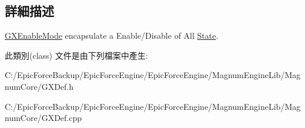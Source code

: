\subsection{詳細描述}
\hyperlink{class_magnum_1_1_g_x_enable_mode}{G\+X\+Enable\+Mode} encapsulate a Enable/\+Disable of All \hyperlink{class_magnum_1_1_state}{State}. 

此類別(class) 文件是由下列檔案中產生\+:\begin{DoxyCompactItemize}
\item 
C\+:/\+Epic\+Force\+Backup/\+Epic\+Force\+Engine/\+Epic\+Force\+Engine/\+Magnum\+Engine\+Lib/\+Magnum\+Core/G\+X\+Def.\+h\item 
C\+:/\+Epic\+Force\+Backup/\+Epic\+Force\+Engine/\+Epic\+Force\+Engine/\+Magnum\+Engine\+Lib/\+Magnum\+Core/G\+X\+Def.\+cpp\end{DoxyCompactItemize}
